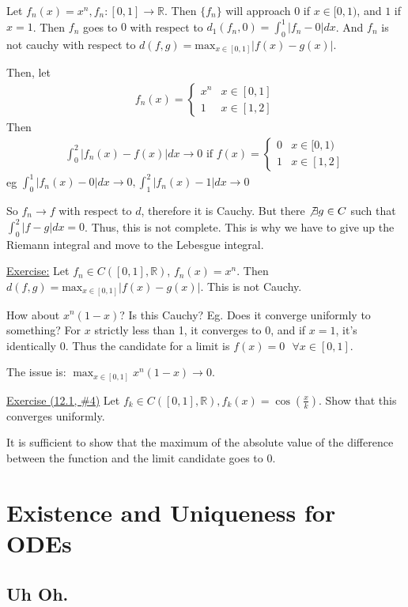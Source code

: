 \documentclass{article}
\newcommand*{\txt}[1]{\text{ #1 }}%
\newcommand*{\fora}{\txt{}\forall}%
\newcommand*{\rr}{\mathbb{R}}%
\begin{document}
Let $f_n(x)=x^n, f_n:[0,1]\to\rr$. Then $\{f_n\}$ will approach $0$ if $x\in[0,1)$, and $1$ if $x=1$. Then $f_n$ goes to $0$ with respect to $d_1(f_n,0)=\int_{0}^{1}|f_n-0|dx$. And $f_n$ is not cauchy with respect to $d(f,g)=\text{max}_{x\in[0,1]}|f(x)-g(x)|$.

Then, let \begin{align*}
    f_n(x)=\begin{cases}
        x^n & x\in[0,1] \\
        1 & x\in[1,2]
    \end{cases}
\end{align*} Then \begin{align*}
    \int_{0}^{2}|f_n(x)-f(x)|dx\to 0\txt{if}f(x)=\begin{cases}
        0 & x\in[0,1) \\
        1 & x\in[1,2]
    \end{cases}
\end{align*}
eg $\int_{0}^{1}|f_n(x)-0|dx\to 0, \int_{1}^{2}|f_n(x)-1|dx\to 0$

So $f_n\to f$ with respect to $d$, therefore it is Cauchy. But there $\not\exists g\in C$ such that $\int_{0}^{2}|f-g|dx=0$. Thus, this is not complete. This is why we have to give up the Riemann integral and move to the Lebesgue integral.

\underline{Exercise:} Let $f_n\in C([0,1],\rr)$, $f_n(x)=x^n$. Then $d(f,g)=\text{max}_{x\in[0,1]}|f(x)-g(x)|$. This is not Cauchy.

How about $x^n(1-x)$? Is this Cauchy? Eg. Does it converge uniformly to something? For $x$ strictly less than 1, it converges to 0, and if $x=1$, it's identically 0. Thus the candidate for a limit is $f(x)=0 \fora x\in[0,1]$.

The issue is: $\max_{x\in[0,1]}x^n(1-x)\to 0$. 

\underline{Exercise (12.1, \#4)} Let $f_k\in C([0,1],\rr), f_k(x)=\cos(\frac{x}{k})$. Show that this converges uniformly. 

It is sufficient to show that the maximum of the absolute value of the difference between the function and the limit candidate goes to 0. 

\section{Existence and Uniqueness for ODEs}

\subsection{Uh Oh.}
\end{document}
